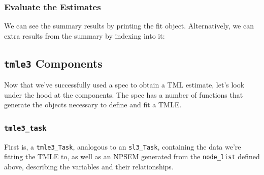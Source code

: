 \documentclass[12pt, krantz2,]{krantz}
\newenvironment{Shaded}{\begin{snugshade}}{\end{snugshade}}
\newcommand{\DecValTok}[1]{\textcolor[rgb]{0.06,0.06,0.06}{#1}}
\newcommand{\FloatTok}[1]{\textcolor[rgb]{0.06,0.06,0.06}{#1}}
\newcommand{\KeywordTok}[1]{\textcolor[rgb]{0.27,0.27,0.27}{\textbf{#1}}}
\newcommand{\NormalTok}[1]{#1}
\newcommand{\OperatorTok}[1]{\textcolor[rgb]{0.43,0.43,0.43}{\textbf{#1}}}
\newcommand{\StringTok}[1]{\textcolor[rgb]{0.5,0.5,0.5}{#1}}
\theoremstyle{definition}
\theoremstyle{definition}
\theoremstyle{definition}
\newcommand{\1}{\mathbbm{1}}
\begin{document}
\hypertarget{evaluate-the-estimates}{%
\subsubsection{Evaluate the Estimates}\label{evaluate-the-estimates}}

We can see the summary results by printing the fit object. Alternatively, we
can extra results from the summary by indexing into it:

\begin{Shaded}
\end{Shaded}

\hypertarget{tmle3-components}{%
\subsection{\texorpdfstring{\texttt{tmle3} Components}{tmle3 Components}}\label{tmle3-components}}

Now that we've successfully used a spec to obtain a TML estimate, let's look
under the hood at the components. The spec has a number of functions that
generate the objects necessary to define and fit a TMLE.

\hypertarget{tmle3_task}{%
\subsubsection{\texorpdfstring{\texttt{tmle3\_task}}{tmle3\_task}}\label{tmle3_task}}

First is, a \texttt{tmle3\_Task}, analogous to an \texttt{sl3\_Task}, containing the data we're
fitting the TMLE to, as well as an NPSEM generated from the \texttt{node\_list}
defined above, describing the variables and their relationships.

\begin{Shaded}
\end{Shaded}
\end{document}
